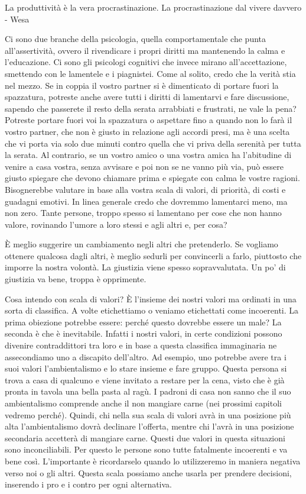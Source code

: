 \documentclass[12pt]{book} %
\begin{document}
La produttività è la vera procrastinazione. La procrastinazione dal vivere davvero - Wesa 

Ci sono due branche della psicologia, quella comportamentale che punta all'assertività, ovvero il
rivendicare i propri diritti ma mantenendo la calma e l'educazione. Ci sono gli psicologi
cognitivi che invece mirano all'accettazione, smettendo con le lamentele e i piagnistei. Come al
solito, credo che la verità stia nel mezzo. Se in coppia il vostro partner si è dimenticato di portare fuori la
spazzatura, potreste anche avere tutti i diritti di lamentarvi e fare discussione, sapendo che passerete il resto della
serata arrabbiati e frustrati, ne vale la pena? Potreste portare fuori voi la spazzatura o aspettare fino a quando non
lo farà il vostro partner, che non è giusto in relazione agli accordi presi, ma è una scelta che vi porta via solo due
minuti contro quella che vi priva della serenità per tutta la serata. Al contrario, se un vostro amico o una vostra
amica ha l'abitudine di venire a casa vostra, senza avvisare e poi non se ne vanno più via, può
essere giusto spiegare che devono chiamare prima e spiegate con calma le vostre ragioni. Bisognerebbe valutare in base
alla vostra scala di valori, di priorità, di costi e guadagni emotivi. In linea generale credo che dovremmo lamentarci
meno, ma non zero. Tante persone, troppo spesso si lamentano per cose che non hanno valore, rovinando
l'umore a loro stessi e agli altri e, per cosa?

È meglio suggerire un cambiamento negli altri che pretenderlo. Se vogliamo ottenere qualcosa dagli altri, è meglio
sedurli per convincerli a farlo, piuttosto che imporre la nostra volontà. La giustizia viene spesso sopravvalutata. Un
po' di giustizia va bene, troppa è opprimente.


\bigskip

Cosa intendo con scala di valori? È l'insieme dei nostri valori ma ordinati in una sorta di
classifica. A volte etichettiamo o veniamo etichettati come incoerenti. La prima obiezione potrebbe essere: perché
questo dovrebbe essere un male? La seconda è che è inevitabile. Infatti i nostri valori, in certe condizioni possono
divenire contraddittori tra loro e in base a questa classifica immaginaria ne assecondiamo uno a discapito
dell'altro. Ad esempio, uno potrebbe avere tra i suoi valori l'ambientalismo
e lo stare insieme e fare gruppo. Questa persona si trova a casa di qualcuno e viene invitato a restare per la cena,
visto che è già pronta in tavola una bella pasta al ragù. I padroni di casa non sanno che il suo ambientalismo
comprende anche il non mangiare carne (nei prossimi capitoli vedremo perché). Quindi, chi nella sua scala di valori
avrà in una posizione più alta l'ambientalismo dovrà declinare l'offerta,
mentre chi l'avrà in una posizione secondaria accetterà di mangiare carne. Questi due valori in
questa situazioni sono inconciliabili. Per questo le persone sono tutte fatalmente incoerenti e va bene così.
L'importante è ricordarselo quando lo utilizzeremo in maniera negativa verso noi o gli altri.
Questa scala possiamo anche usarla per prendere decisioni, inserendo i pro e i contro per ogni alternativa.
\end{document}

